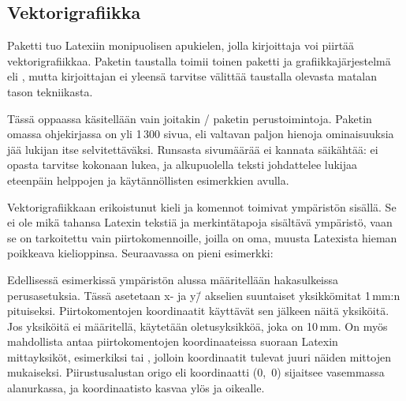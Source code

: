 \subsection{Vektorigrafiikka}

Paketti  tuo Latexiin monipuolisen apukielen, jolla
kirjoittaja voi piirtää vektorigrafiikkaa. Paketin taustalla toimii
toinen paketti ja grafiikkajärjestelmä  eli
, mutta kirjoittajan ei yleensä
tarvitse välittää taustalla olevasta matalan tason tekniikasta.

Tässä oppaassa käsitellään vain joitakin \-/ paketin
perustoimintoja. Paketin omassa ohjekirjassa on yli 1\,300 sivua, eli
valtavan paljon hienoja ominaisuuksia jää lukijan itse selvitettäväksi.
Runsasta sivumäärää ei kannata säikähtää: ei opasta tarvitse kokonaan
lukea, ja alkupuolella teksti johdattelee lukijaa eteenpäin helppojen ja
käytännöllisten esimerkkien avulla.

Vektorigrafiikkaan erikoistunut kieli ja komennot toimivat ympäristön
 sisällä. Se ei ole mikä tahansa Latexin tekstiä
ja merkintätapoja sisältävä ympäristö, vaan se on tarkoitettu vain
piirtokomennoille, joilla on oma, muusta Latexista hieman poikkeava
kielioppinsa. Seuraavassa on pieni esimerkki:

\begin{koodilohkosis}
\end{koodilohkosis}

\begin{tulossis}
\end{tulossis}

\noindent
Edellisessä esimerkissä ympäristön alussa määritellään hakasulkeissa
perusasetuksia. Tässä asetetaan x- ja y\=/ akselien suuntaiset
yksikkömitat 1\,mm:n pituiseksi. Piirtokomentojen koordinaatit käyttävät
sen jälkeen näitä yksiköitä. Jos yksiköitä ei määritellä, käytetään
oletusyksikköä, joka on 10\,mm. On myös mahdollista antaa
piirtokomentojen koordinaateissa suoraan Latexin mittayksiköt,
esimerkiksi \koodi{(25mm,5mm)} tai \koodi{(10bp,20bp)}, jolloin
koordinaatit tulevat juuri näiden mittojen mukaiseksi. Piirustusalustan
origo eli koordinaatti (0,~0) sijaitsee vasemmassa alanurkassa, ja
koordinaatisto kasvaa ylös ja oikealle.

